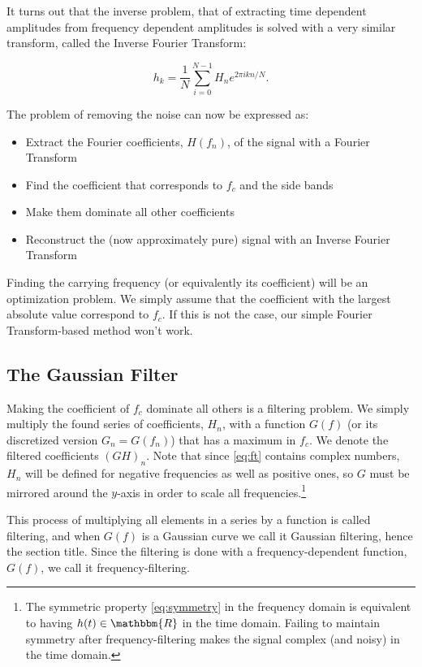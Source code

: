 \documentclass[12pt,a4paper]{article}
\newcommand{\R}{\ensuremath{\mathbbm{R}}}
\begin{document}
It turns out that the inverse problem, that of extracting time dependent
amplitudes from frequency dependent amplitudes is solved with a very
similar transform, called the Inverse Fourier Transform:

\begin{equation}\label{eq:ift}
  h_k = \frac1N\sum_{i=0}^{N-1}H_ne^{2\pi ikn/N}.
\end{equation}

The problem of removing the noise can now be expressed as:
\begin{itemize}
  \item Extract the Fourier coefficients, $H(f_n)$, of the signal with a Fourier Transform
  \item Find the coefficient that corresponds to $f_c$ and the side bands
  \item Make them dominate all other coefficients
  \item Reconstruct the (now approximately pure) signal with an Inverse Fourier Transform
\end{itemize}

Finding the carrying frequency (or equivalently its coefficient) will be
an optimization problem. We simply assume that the coefficient with the largest absolute value
correspond to $f_c$. If this is not the case, our simple Fourier Transform-based
method won't work.

\subsection{The Gaussian Filter}\label{sec:gauss}
Making the coefficient of $f_c$ dominate all others is a filtering problem.
We simply multiply the found series of coefficients, $H_n$, with a function
$G(f)$ (or its discretized version $G_n = G(f_n)$) that has a maximum in $f_c$.
We denote the filtered coefficients $(GH)_n$.
Note that since \eqref{eq:ft} contains complex numbers, $H_n$ will be defined
for negative frequencies as well as positive ones, so $G$ must be mirrored
around the $y$-axis in order to scale all frequencies.\footnote{The symmetric
  property \eqref{eq:symmetry} in the frequency domain is equivalent
  to having $h(t)\in\R$ in the time domain. Failing to maintain symmetry
  after frequency-filtering makes the signal complex (and noisy) in the time domain.}

This process of multiplying all elements in a series by a function
is called filtering, and when $G(f)$ is a Gaussian curve we
call it Gaussian filtering, hence the section title.
Since the filtering is done with a frequency-dependent function, $G(f)$,
we call it frequency-filtering.
\end{document}
